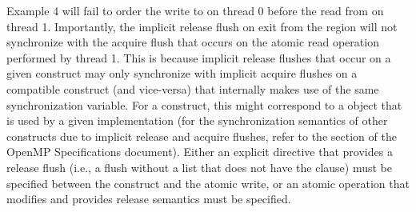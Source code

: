 
Example 4 will fail to order the write to  on thread 0 before the read
from  on thread 1. Importantly, the implicit release flush on exit from
the  region will not synchronize with the acquire flush that
occurs on the atomic read operation performed by thread 1. This is because
implicit release flushes that occur on a given construct may only synchronize
with implicit acquire flushes on a compatible construct (and vice-versa) that
internally makes use of the same synchronization variable. For a
 construct, this might correspond to a  object that
is used by a given implementation (for the synchronization semantics of other
constructs due to implicit release and acquire flushes, refer to the  section of the OpenMP Specifications document).  Either an explicit 
directive that provides a release flush (i.e., a flush without a list that does
not have the  clause) must be specified between the
 construct and the atomic write, or an atomic operation that
modifies  and provides release semantics must be specified.


